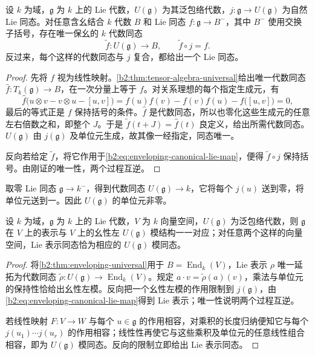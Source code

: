 \begin{theorem}[泛包络代数的泛性质]\label{b2:thm:enveloping-universal}
	设 \(k\) 为域，\(\mathfrak g\) 为 \(k\) 上的 Lie 代数，\(U(\mathfrak g)\) 为其泛包络代数，\(j:\mathfrak g\rightarrow U(\mathfrak g)\) 为自然 Lie 同态。对任意含幺结合 \(k\) 代数 \(B\) 和 Lie 同态 \(f:\mathfrak g\to B^-\)，其中 \(B^-\) 使用交换子括号，存在唯一保幺的 \(k\) 代数同态
	\[
		\widetilde f:U(\mathfrak g)\longrightarrow B, \qquad \widetilde f\circ j=f.
	\]
	反过来，每个这样的代数同态与 \(j\) 复合，都给出一个 Lie 同态。
\end{theorem}
\begin{proof}
	先将 \(f\) 视为线性映射。\cref{b2:thm:tensor-algebra-universal}给出唯一代数同态 \(\widehat f:T_k(\mathfrak g)\to B\)，在一次分量上等于 \(f\)。对关系理想的每个指定生成元，有
	\[
		\widehat f\bigl(u\otimes v-v\otimes u-[u,v]\bigr) =f(u)f(v)-f(v)f(u)-f\bigl([u,v]\bigr)=0,
	\]
	最后的等式正是 \(f\) 保持括号的条件。\(\widehat f\) 是代数同态，所以也零化这些生成元的任意左右倍数之和，即整个 \(J\)。于是 \(\widetilde f(t+J)=\widehat f(t)\) 良定义，给出所需代数同态。\(U(\mathfrak g)\) 由 \(j(\mathfrak g)\) 及单位元生成，故其像一经指定，同态唯一。

	反向若给定 \(\widetilde f\)，将它作用于\eqref{b2:eq:enveloping-canonical-lie-map}，便得 \(\widetilde f\circ j\) 保持括号。由刚证的唯一性，两个过程互逆。
\end{proof}

取零 Lie 同态 \(\mathfrak g\to k^-\)，得到代数同态 \(U(\mathfrak g)\to k\)，它将每个 \(j(u)\) 送到零，将单位元送到一。因此 \(U(\mathfrak g)\) 的单位元非零。

\begin{corollary}\label{b2:cor:lie-representations-enveloping-modules}
	设 \(k\) 为域，\(\mathfrak g\) 为 \(k\) 上的 Lie 代数，\(V\) 为 \(k\) 向量空间，\(U(\mathfrak g)\) 为泛包络代数，则 \(\mathfrak g\) 在 \(V\) 上的表示与 \(V\) 上的幺性左 \(U(\mathfrak g)\) 模结构一一对应；对任意两个这样的向量空间，Lie 表示同态恰为相应的 \(U(\mathfrak g)\) 模同态。
\end{corollary}
\begin{proof}
	将\cref{b2:thm:enveloping-universal}用于 \(B=\operatorname{End}_k(V)\)，Lie 表示 \(\rho\) 唯一延拓为代数同态 \(\widetilde\rho:U(\mathfrak g)\to\operatorname{End}_k(V)\)。规定 \(a\cdot v=\widetilde\rho(a)(v)\)，乘法与单位元的保持性恰给出幺性左模。反向把一个幺性左模的作用限制到 \(j(\mathfrak g)\)，由\eqref{b2:eq:enveloping-canonical-lie-map}得到 Lie 表示；唯一性说明两个过程互逆。

	若线性映射 \(F:V\to W\) 与每个 \(u\in\mathfrak g\) 的作用相容，对乘积的长度归纳便知它与每个 \(j(u_1)\cdots j(u_r)\) 的作用相容；线性性再使它与这些乘积及单位元的任意线性组合相容，即为 \(U(\mathfrak g)\) 模同态。反向的限制立即给出 Lie 表示同态。
\end{proof}

